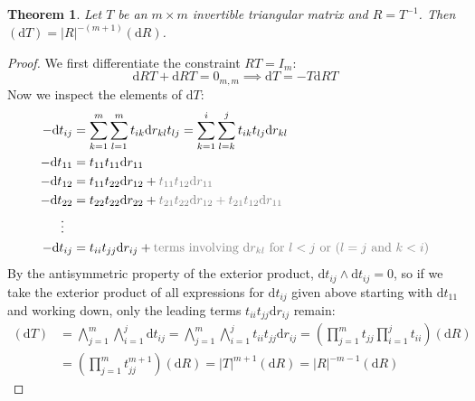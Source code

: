 \documentclass[12pt,a4paper,reqno]{amsart}
\numberwithin{equation}{section}
\newtheorem{theorem}{Theorem}[section]
\renewcommand{\det}[1]{\left| {#1} \right|}
\newcommand{\dmeasure}[1]{\left(\dd{#1}\right)}
\newcommand{\dd}[1]{\mathrm{d}{#1}}
\newcommand{\zeromat}[2]{0_{#1,#2}}
\begin{document}
\begin{theorem}\label{thm:triinvjac}
    Let $T$ be an $m \times m$ invertible triangular matrix and $R=T^{-1}$.
    Then $\dmeasure{T} = \det{R}^{-(m+1)} \dmeasure{R}$.
\end{theorem}
\begin{proof}
    We first differentiate the constraint $R T = I_m$:
    \[
        \dd{R} T + \dd{R} T = \zeromat{m}{m} \implies \dd{T} = -T \dd{R}T
    \]
    Now we inspect the elements of $\dd{T}$:
    \begin{align*}
        -\dd{t}_{ij} & = \sum_{k=1}^m \sum_{l=1}^m t_{ik} \dd{r}_{kl} t_{lj} = \sum_{k=1}^i \sum_{l=k}^j t_{ik} t_{lj} \dd{r}_{kl}                                  \\
        -\dd{t}_{11} & = t_{11} t_{11} \dd{r}_{11}                                                                                                                  \\
        -\dd{t}_{12} & = t_{11} t_{22} \dd{r}_{12} + \textcolor{gray}{t_{11} t_{12} \dd{r}_{11}}                                                                    \\
        -\dd{t}_{22} & = t_{22} t_{22} \dd{r}_{22} + \textcolor{gray}{t_{21} t_{22} \dd{r}_{12} + t_{21} t_{12} \dd{r}_{11}}                                        \\
        \vdots \ \   &                                                                                                                                              \\
        -\dd{t}_{ij} & = t_{ii} t_{jj}\dd{r}_{ij} + \textcolor{gray}{\text{terms involving } \dd{r}_{kl} \text{ for } l < j \text{ or } (l = j \text{ and } k < i)}
    \end{align*}
    By the antisymmetric property of the exterior product, $\dd{t}_{ij} \wedge \dd{t}_{ij} = 0$, so if we take the exterior product of all expressions for $\dd{t}_{ij}$ given above starting with $\dd{t}_{11}$ and working down, only the leading terms $t_{ii} t_{jj} \dd{r}_{ij}$ remain:
    \begin{align*}
        \dmeasure{T} & = \bigwedge_{j=1}^m \bigwedge_{i=1}^j \dd{t}_{ij} = \bigwedge_{j=1}^m \bigwedge_{i=1}^j t_{ii} t_{jj} \dd{r}_{ij} = \left(\prod_{j=1}^m t_{jj} \prod_{i=1}^j t_{ii} \right) \dmeasure{R} \\
                     & =\left(\prod_{j=1}^m t_{jj}^{m+1}\right) \dmeasure{R} = \det{T}^{m+1} \dmeasure{R} = \det{R}^{-m-1} \dmeasure{R}
    \end{align*}
\end{proof}
\end{document}
